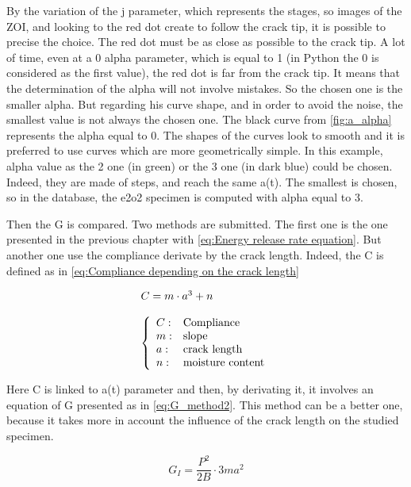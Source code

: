 By the variation of the j parameter, which represents the stages, so images of the ZOI, and looking to the red dot create to follow the crack tip, it is possible to precise the choice. The red dot must be as close as possible to the crack tip. A lot of time, even at a 0 alpha parameter, which is equal to 1 (in Python the 0 is considered as the first value), the red dot is far from the crack tip. It means that the determination of the alpha will not involve mistakes. So the chosen one is the smaller alpha. But regarding his curve shape, and in order to avoid the noise, the smallest value is not always the chosen one. The black curve from \ref{fig:a_alpha} represents the alpha equal to 0. The shapes of the curves look to smooth and it is preferred to use curves which are more geometrically simple. In this example, alpha value as the 2 one (in green) or the 3 one (in dark blue) could be chosen. Indeed, they are made of steps, and reach the same a(t). The smallest is chosen, so in the database, the e2o2 specimen is computed with alpha equal to 3.

Then the G is compared. Two methods are submitted. The first one is the one presented in the previous chapter with \ref{eq:Energy release rate equation}. But another one use the compliance derivate by the crack length. Indeed, the C is defined as in \ref{eq:Compliance depending on the crack length}

\begin{equation}
	\begin{array}{l}
		C= m\cdot a^{3} + n
		\\
		\\
		\left\{
		\begin{array}{llll}
			C: & $Compliance$ \\
			m: & $slope$ \\
			a: & $crack length$ \\ 
			n: & $moisture content$ \\
		\end{array}{}
		\right.
	\end{array}{}
	\label{eq:Compliance depending on the crack length}
\end{equation}   

Here C is linked to a(t) parameter and then, by derivating it, it involves an equation of G presented as in \ref{eq:G_method2}. This method can be a better one, because it takes more in account the influence of the crack length on the studied specimen. 

\begin{equation}
	G_{I}= \frac{P^{2}}{2B}\cdot3ma^{2}
	\label{eq:G_method2}
\end{equation}   
